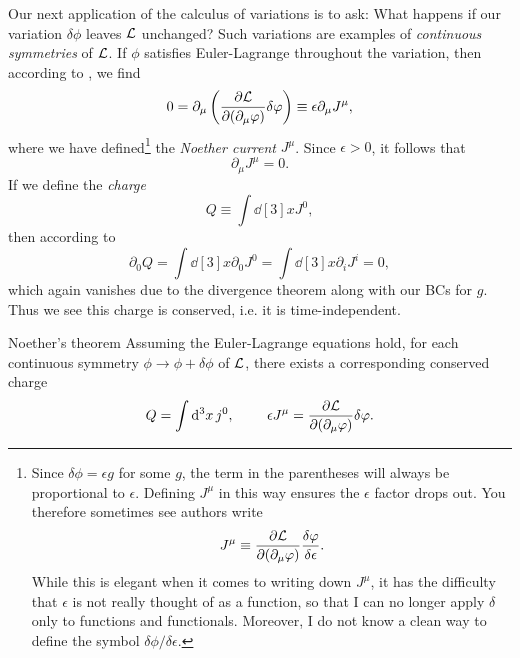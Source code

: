 Our next application of the calculus of variations is to ask: What happens if
our variation $\delta\phi$ leaves $\mathcal{L}$ unchanged? Such variations are
examples of {\it continuous symmetries} of $\mathcal{L}$. If $\phi$ satisfies
Euler-Lagrange throughout the variation, then according to
, we find
\begin{equation}
0=\partial_\mu\left(\pdv{\mathcal{L}}{(\partial_\mu\varphi)}\delta\varphi\right)
\equiv\epsilon\partial_\mu J^\mu,
\end{equation}
where we have defined\footnote{Since $\delta\phi=\epsilon g$ for some $g$,
the term in the parentheses will always be proportional to $\epsilon$.
Defining $J^\mu$ in this way ensures the $\epsilon$ factor drops out. You
therefore sometimes see authors write
$$
J^\mu\equiv\pdv{\mathcal{L}}{(\partial_\mu\varphi)}\frac{\delta\varphi}{\delta\epsilon}.
$$
While this is elegant when it comes to writing down $J^\mu$, it has the
difficulty that $\epsilon$ is not really thought of as a function, so that
I can no longer apply $\delta$ only to functions and functionals.
Moreover, I do not know a clean way to define the symbol 
$\delta\phi/\delta\epsilon$.
}
the {\it Noether current} $J^\mu$. Since $\epsilon>0$, it
follows that
\begin{equation}\label{eq:noetherCurrent}
\partial_\mu J^\mu=0.
\end{equation}
If we define the {\it charge}
\begin{equation}
Q\equiv\int\dd[3]{x}J^0,
\end{equation}
then according to 
\begin{equation}
\partial_0Q
=\int\dd[3]{x}\partial_0J^0
=\int\dd[3]{x}\partial_iJ^i
=0,
\end{equation}
which again vanishes due to the divergence theorem along with our BCs for $g$.
Thus we see this charge is conserved, i.e. it is time-independent.

\begin{theorem}{Noether's theorem}{}
Assuming the Euler-Lagrange equations hold, for each continuous symmetry
$\phi\to\phi+\delta\phi$ of $\mathcal{L}$, there exists a corresponding conserved charge 
$$
Q=\int\dd[3]{x}j^0, ~~~~~~~ \epsilon J^\mu=\pdv{\mathcal{L}}{(\partial_\mu\varphi)}\delta\varphi.
$$
\end{theorem}

